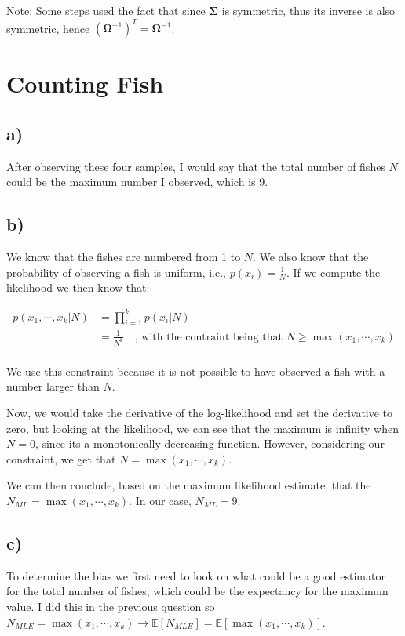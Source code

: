 \documentclass[12pt,a4paper,oneside]{paper}
\begin{document}
Note: Some steps used the fact that since $\bm{\Sigma}$ is symmetric, thus its inverse is also symmetric, hence
$(\bm{\Omega}^{-1})^T = \bm{\Omega}^{-1}$.

\newpage
\section{Counting Fish}

\subsection*{a)}
After observing these four samples, I would say that the total number of fishes $N$ could be the maximum number I observed, which is 9.  

\subsection*{b)}
We know that the fishes are numbered from 1 to $N$. We also know that the probability of observing a fish is uniform, i.e., $p(x_i) = \frac{1}{N}$.
If we compute the likelihood we then know that: 

\begin{align*}
    p(x_1, \cdots, x_k | N) &= \prod_{i=1}^{k} p(x_i | N) \\
    &= \frac{1}{N^k} \quad \text{, with the contraint being that } N \geq \max(x_1, \cdots, x_k) \\
\end{align*}

We use this constraint because it is not possible to have observed a fish with a number larger than $N$.

Now, we would take the derivative of the log-likelihood and set the derivative to zero, but looking at the likelihood, we
can see that the maximum is infinity when $N = 0$, since its a monotonically decreasing function. 
However, considering our constraint, we get that $N = \max(x_1, \cdots, x_k)$.

We can then conclude, based on the maximum likelihood estimate, that the $N_{ML} = \max(x_1, \cdots, x_k)$.
In our case, $N_{ML} = 9$.

\newpage
\subsection*{c)}

To determine the bias we first need to look on what could be a good estimator for the total number of fishes, 
which could be the expectancy for the maximum value. I did this in the previous question so 
$N_{MLE} = \max(x_1, \cdots, x_k) \rightarrow \mathbb{E}[N_{MLE}] = \mathbb{E}[\max(x_1, \cdots, x_k)]$.
\end{document}
